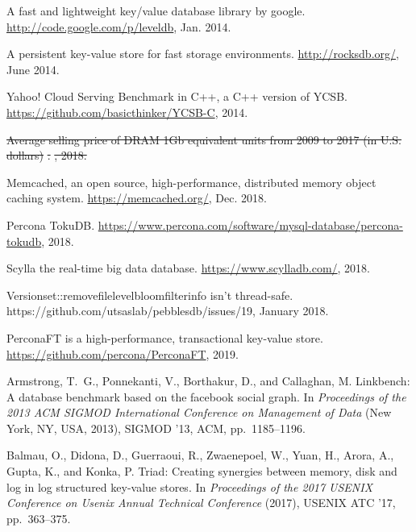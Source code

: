 \documentclass[sigplan,10pt]{acmart}
\providecommand{\DIFdel}[1]{{\protect\color{red}\sout{#1}}}                      %
\providecommand{\DIFdelbegin}{} %
\providecommand{\DIFdelend}{} %
\begin{document}
\begin{thebibliography}{10}
A fast and lightweight key/value database library by google.
\newblock \url{http://code.google.com/p/leveldb}, Jan. 2014.

A persistent key-value store for fast storage environments.
\newblock \url{http://rocksdb.org/}, June 2014.

{Yahoo! Cloud Serving Benchmark in C++, a C++ version of YCSB}.
\newblock \url{https://github.com/basicthinker/YCSB-C}, 2014.

\DIFdelbegin %
\DIFdel{Average selling price of DRAM 1Gb equivalent units from 2009 to 2017 (in U.S.
  dollars)}%
\DIFdel{.
}%
\DIFdel{,
  2018.
}%

\DIFdelend {}
Memcached, an open source, high-performance, distributed memory object caching
  system.
\newblock \url{https://memcached.org/}, Dec. 2018.

{Percona TokuDB}.
\newblock \url{https://www.percona.com/software/mysql-database/percona-tokudb},
  2018.

Scylla the real-time big data database.
\newblock \url{https://www.scylladb.com/}, 2018.

Versionset::removefilelevelbloomfilterinfo isn't thread-safe.
\newblock https://github.com/utsaslab/pebblesdb/issues/19, January 2018.

{PerconaFT is a high-performance, transactional key-value store}.
\newblock \url{https://github.com/percona/PerconaFT}, 2019.

{\sc Armstrong, T.~G., Ponnekanti, V., Borthakur, D., and Callaghan, M.}
\newblock Linkbench: A database benchmark based on the facebook social graph.
\newblock In {\em Proceedings of the 2013 ACM SIGMOD International Conference
  on Management of Data\/} (New York, NY, USA, 2013), SIGMOD '13, ACM,
  pp.~1185--1196.

{\sc Balmau, O., Didona, D., Guerraoui, R., Zwaenepoel, W., Yuan, H., Arora,
  A., Gupta, K., and Konka, P.}
\newblock Triad: Creating synergies between memory, disk and log in log
  structured key-value stores.
\newblock In {\em Proceedings of the 2017 USENIX Conference on Usenix Annual
  Technical Conference\/} (2017), USENIX ATC '17, pp.~363--375.


\end{thebibliography}
\end{document}
